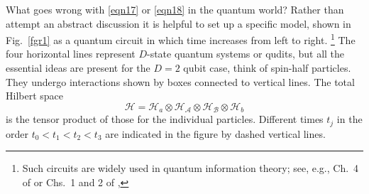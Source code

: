 \documentclass[10pt]{article} %
\newcommand{\ot}{\otimes }
\newcommand{\AM}{{\mathcal A}}
\newcommand{\BM}{{\mathcal B}}
\newcommand{\HM}{{\mathcal H}}
\begin{document}
What goes wrong with \eqref{eqn17} or \eqref{eqn18} in the quantum world?
Rather than attempt an abstract discussion it is helpful to set up a specific
model, shown in Fig.~\ref{fgr1} as a quantum circuit in which time increases
from left to right.%
\footnote{Such circuits are widely used in quantum information theory; see,
  e.g., Ch.~4 of \cite{NlCh00} or Chs.~1 and 2 of \cite{Mrmn07},} %
The four horizontal lines represent $D$-state
quantum systems or qudits, but all the essential ideas are present for the
$D=2$ qubit case, think of spin-half particles.  They undergo interactions
shown by boxes connected to vertical lines.  The total
Hilbert space
\begin{equation}
  \HM = \HM_a \ot\HM_\AM \ot\HM_\BM \ot\HM_b 
\label{eqn23}
\end{equation}
is the tensor product of those for the individual particles. Different times
$t_j$ in the order $t_0 < t_1 < t_2 < t_3$ are indicated in the figure by
dashed vertical lines.
\end{document}
